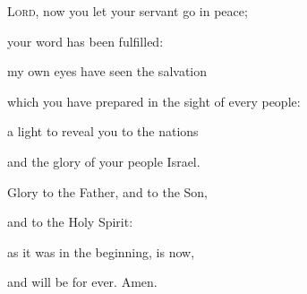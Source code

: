 \lettrine[loversize=0.15,lines=2]{L}{ord,} now you let your servant go in peace;~\GreStar{}~\nopagebreak

\hspace{2pt} your word has been fulfilled:

\noindent my own eyes have seen the salvation~\GreStar{}~\nopagebreak

which you have prepared in the sight of every people:

\noindent a light to reveal you to the nations~\GreStar{}~\nopagebreak

and the glory of your people Israel.

\noindent Glory to the Father, and to the Son,~\GreStar{}~\nopagebreak

and to the Holy Spirit:

\noindent as it was in the beginning, is now,~\GreStar{}~\nopagebreak

and will be for ever. Amen.
